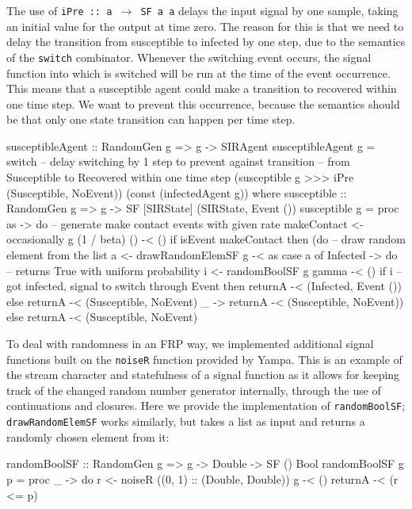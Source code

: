The use of \texttt{iPre :: a $\rightarrow$ SF a a} delays the input signal by one sample, taking an initial value for the output at time zero. The reason for this is that we need to delay the transition from susceptible to infected by one step, due to the semantics of the \texttt{switch} combinator. Whenever the switching event occurs, the signal function into which is switched will be run at the time of the event occurrence. This means that a susceptible agent could make a transition to recovered within one time step. We want to prevent this occurrence, because the semantics should be that only one state transition can happen per time step.

\begin{HaskellCode}
susceptibleAgent :: RandomGen g => g -> SIRAgent
susceptibleAgent g 
    = switch 
      -- delay switching by 1 step to prevent against transition
      -- from Susceptible to Recovered within one time step
      (susceptible g >>> iPre (Susceptible, NoEvent)) 
      (const (infectedAgent g))
  where
    susceptible :: RandomGen g => g -> SF [SIRState] (SIRState, Event ())
    susceptible g = proc as -> do
      -- generate make contact events with given rate
      makeContact <- occasionally g (1 / beta) () -< ()
      if isEvent makeContact
        then (do
          -- draw random element from the list
          a <- drawRandomElemSF g -< as
          case a of
            Infected -> do
              -- returns True with uniform probability
              i <- randomBoolSF g gamma -< ()
              if i
                -- got infected, signal to switch through Event
                then returnA -< (Infected, Event ())
                else returnA -< (Susceptible, NoEvent)
             _       -> returnA -< (Susceptible, NoEvent))
        else returnA -< (Susceptible, NoEvent)
\end{HaskellCode}

To deal with randomness in an FRP way, we implemented additional signal functions built on the \texttt{noiseR} function provided by Yampa. This is an example of the stream character and statefulness of a signal function as it allows for keeping track of the changed random number generator internally, through the use of continuations and closures. Here we provide the implementation of \texttt{randomBoolSF}; \texttt{drawRandomElemSF} works similarly, but takes a list as input and returns a randomly chosen element from it:

\begin{HaskellCode}
randomBoolSF :: RandomGen g => g -> Double -> SF () Bool
randomBoolSF g p = proc _ -> do
  r <- noiseR ((0, 1) :: (Double, Double)) g -< ()
  returnA -< (r <= p)
\end{HaskellCode}

